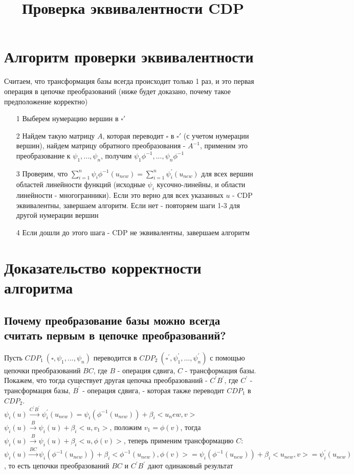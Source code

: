 \documentclass[16pt]{article}
\title{Проверка эквивалентности CDP}
\begin{document}
\maketitle

\section{Алгоритм проверки эквивалентности}
Считаем, что трансформация базы всегда происходит только 1 раз, и это первая операция в цепочке преобразований (ниже будет доказано, почему такое предположение корректно)
\\

\begin{itemize}
\item[1] Выберем нумерацию вершин в $\square'$
\item[2] Найдем такую матрицу $A$, которая переводит $\square$ в $\square'$ (с учетом нумерации вершин), найдем матрицу обратного преобразования - $A^{-1}$, применим это преобразование к $\psi_1, ..., \psi_n$, получим $\psi_1\phi^{-1}, ..., \psi_n\phi^{-1}$
\item[3] Проверим, что $\sum_{i=1}^n\psi_i\phi^{-1}(u_{new}) = \sum_{i=1}^n\psi_i^{'}(u_{new})$ для всех вершин областей линейности функций (исходные $\psi_i$ кусочно-линейны, и области линейности - многогранники). Если это верно для всех указанных $u$ - CDP эквивалентны, завершаем алгоритм. Если нет - повторяем шаги 1-3 для другой нумерации вершин
\item[4] Если дошли до этого шага - CDP не эквивалентны, завершаем алгоритм

\end{itemize}

\section{Доказательство корректности алгоритма}
\subsection{Почему преобразование базы можно всегда считать первым в цепочке преобразований?}
Пусть $CDP_1\ (\square, \psi_1, ..., \psi_n)$ переводится в $CDP_2\ (\square^{'}, \psi_1^{'}, ..., \psi_n^{'})$ с помощью цепочки преобразований $BC$, где $B$ - операция сдвига, $C$ - трансформация базы. Покажем, что тогда существует другая цепочка преобразований - $C^{'}B^{'}$, где  $C^{'}$ - трансформация базы, $B^{'}$ - операция сдвига, - которая также переводит $CDP_1$ в $CDP_2$.
\\
$\psi_i(u) \xrightarrow[]{C^{'}B^{'}} \psi_i^{'}(u_{new}) = \psi_i(\phi^{-1}(u_{new})) + \beta_i<u_new, v>$
\\
$\psi_i(u) \xrightarrow[]{B} \psi_i(u) + \beta_i<u, v_1>$, положим $v_1 = \phi(v)$, тогда $\psi_i(u) \xrightarrow[]{B} \psi_i(u) + \beta_i<u, \phi(v)>$, теперь применим трансформацию $C$: 
$\psi_i(u) \xrightarrow[]{BC} \psi_i(\phi^{-1}(u_{new})) + \beta_i<\phi^{-1}(u_{new}), \phi(v)> = \psi_i(\phi^{-1}(u_{new})) + \beta_i<u_{new}, v> = \psi_i^{'}(u_{new})$, то есть цепочки преобразований $BC$ и $C^{'}B^{'}$ дают одинаковый результат
\end{document}
